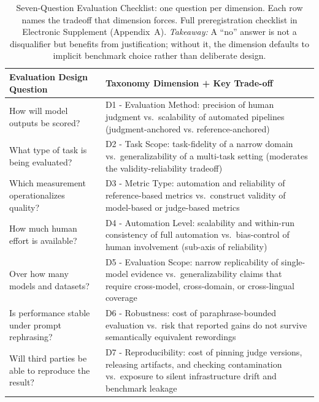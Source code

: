 \documentclass[acmsmall, nonacm, screen]{acmart}
\begin{document}
\begin{table}[!t]
\renewcommand{\arraystretch}{1.3}
\caption{Seven-Question Evaluation Checklist: one question per
dimension. Each row names the tradeoff that dimension forces. Full
preregistration checklist in Electronic Supplement (Appendix~A).
\textit{Takeaway:} A ``no'' answer is not a disqualifier but
benefits from justification; without it, the dimension defaults to
implicit benchmark choice rather than deliberate design.}
\label{tab:quickref}
\centering
\footnotesize
\begin{tabular}{p{} p{}}
\hline
\textbf{Evaluation Design Question} & \textbf{Taxonomy Dimension + Key Trade-off} \\
\hline
How will model outputs be scored? &
  D1 - Evaluation Method: precision of human judgment vs.\ scalability
  of automated pipelines (judgment-anchored vs. reference-anchored) \\
What type of task is being evaluated? &
  D2 - Task Scope: task-fidelity of a narrow domain vs.\ generalizability
  of a multi-task setting (moderates the validity-reliability tradeoff) \\
Which measurement operationalizes quality? &
  D3 - Metric Type: automation and reliability of reference-based
  metrics vs.\ construct validity of model-based or judge-based metrics \\
How much human effort is available? &
  D4 - Automation Level: scalability and within-run consistency of
  full automation vs.\ bias-control of human involvement (sub-axis of
  reliability) \\
Over how many models and datasets? &
  D5 - Evaluation Scope: narrow replicability of single-model evidence
  vs.\ generalizability claims that require cross-model, cross-domain,
  or cross-lingual coverage \\
Is performance stable under prompt rephrasing? &
  D6 - Robustness: cost of paraphrase-bounded evaluation vs.\ risk that
  reported gains do not survive semantically equivalent rewordings \\
Will third parties be able to reproduce the result? &
  D7 - Reproducibility: cost of pinning judge versions, releasing
  artifacts, and checking contamination vs.\ exposure to silent
  infrastructure drift and benchmark leakage \\
\hline
\end{tabular}
\end{table}

\end{document}
